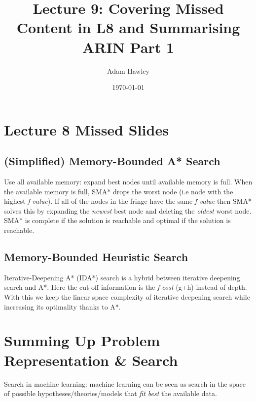 \documentclass[11pt]{article}
\author{Adam Hawley}
\date{\today}
\title{Lecture 9: Covering Missed Content in L8 and Summarising ARIN Part 1}
\begin{document}
\maketitle
\tableofcontents


\section{Lecture 8 Missed Slides}
\label{sec:orgcdf1e47}
\subsection{(Simplified) Memory-Bounded A* Search}
\label{sec:org9f7aeaa}
  Use all available memory: expand best nodes until available memory is full.
When the available memory is full, SMA* drops the worst node (i.e node with the highest \emph{f-value}). 
If all of the nodes in the fringe have the same \emph{f-value} then SMA* solves this by expanding the \emph{newest} best node and deleting the \emph{oldest} worst node.
SMA* is complete if the solution is reachable and optimal if the solution is reachable.
\subsection{Memory-Bounded Heuristic Search}
\label{sec:orgdbd7164}
Iterative-Deepening A* (IDA*) search is a hybrid between iterative deepening search and A*.
Here the cut-off information is the \emph{f-cost} (g+h) instead of depth.
With this we keep the linear space complexity of iterative deepening search while increasing its optimality thanks to A*.

\section{Summing Up Problem Representation \& Search}
\label{sec:org8505422}
Search in machine learning: machine learning can be seen as search in the space of possible hypotheses/theories/models that \emph{fit best} the available data.
\end{document}
